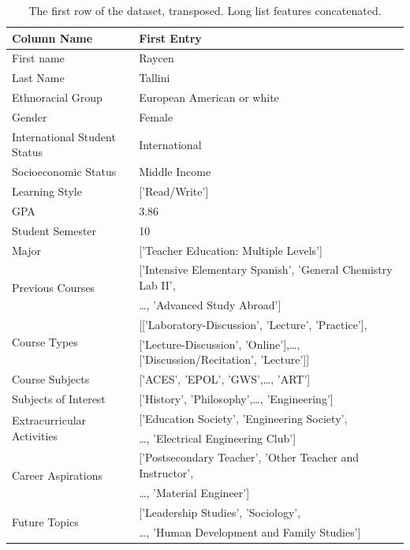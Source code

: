 \documentclass{article}
\begin{document}
\begin{table}[htbp]
  \centering
  \begin{tabular}{|l|l|}
    \hline
    \textbf{Column Name} & \textbf{First Entry} \\ \hline
    First name & Raycen \\ \hline
    Last Name & Tallini \\ \hline
    Ethnoracial Group & European American or white \\ \hline
    Gender & Female \\ \hline
    International Student Status & International \\ \hline
    Socioeconomic Status & Middle Income \\ \hline
    Learning Style & {[}'Read/Write'{]} \\ \hline
    GPA & 3.86 \\ \hline
    Student Semester & 10 \\ \hline
    Major & {[}'Teacher Education: Multiple Levels'{]} \\ \hline
    \multirow{2}{*}{Previous Courses} & {[}'Intensive Elementary Spanish', 'General Chemistry Lab II', \\
    & \ldots, 'Advanced Study Abroad'{]} \\ \hline
    \multirow{2}{*}{Course Types} & {[}{[}'Laboratory-Discussion', 'Lecture', 'Practice'{]}, \\
    & {[}'Lecture-Discussion', 'Online'{]},\ldots, {[}'Discussion/Recitation', 'Lecture'{]}{]} \\ \hline
    Course Subjects & {[}'ACES', 'EPOL', 'GWS',\ldots, 'ART'{]} \\ \hline
    Subjects of Interest & {[}'History', 'Philosophy',\ldots, 'Engineering'{]} \\ \hline
    \multirow{2}{*}{Extracurricular Activities} & {[}'Education Society', 'Engineering Society', \\
    & \ldots, 'Electrical Engineering Club'{]} \\ \hline
    \multirow{2}{*}{Career Aspirations} & {[}'Postsecondary Teacher', 'Other Teacher and Instructor', \\
    & \ldots, 'Material Engineer'{]} \\ \hline
  \multirow{2}{*}{Future Topics} & {[}'Leadership Studies', 'Sociology', \\
  & \ldots, 'Human Development and Family Studies'{]} \\ \hline
  \end{tabular}
  \caption{The first row of the dataset, transposed. Long list features concatenated.}
  \label{tab:first_row_transposed}
\end{table}
\end{document}
